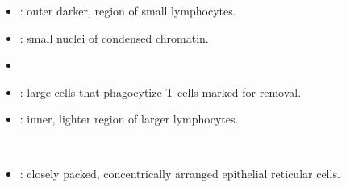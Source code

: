 \begin{itemize}
\begin{multicols}{2}
\begin{itemize}
    \begin{center}
    \end{center}

    \item {}: outer darker, region of small lymphocytes.
    
    \begin{center}
    \end{center}
    
    \item {}: small nuclei of condensed chromatin.
    
    \begin{center}
    \end{center}
    
    \item {}
    
    \begin{center}
    \end{center}
    
    \item {}: large cells that phagocytize T cells marked for removal.
    
    \begin{center}
    \end{center}
    
    \item {}: inner, lighter region of larger lymphocytes. 
    
    \begin{center}
    \end{center}
    \
    \item {}: closely packed, concentrically arranged epithelial reticular cells.
    
    \begin{center}
    \end{center}
    
  \end{itemize}
  \end{multicols}


\end{itemize}
